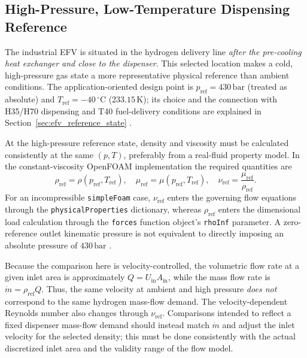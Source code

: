 \subsection{High-Pressure, Low-Temperature Dispensing Reference}
\label{sec:doe_highpressure_state}

The industrial EFV is situated in the hydrogen delivery line \emph{after the pre-cooling heat exchanger and close to the dispenser}. This selected location makes a cold, high-pressure gas state a more representative physical reference than ambient conditions. The application-oriented design point is $p_{\mathrm{ref}}=430\,\mathrm{bar}$ (treated as absolute) and $T_{\mathrm{ref}}=-40\,^{\circ}\mathrm{C}$ ($233.15\,\mathrm{K}$); its choice and the connection with H35/H70 dispensing and T40 fuel-delivery conditions are explained in Section~\ref{sec:efv_reference_state} \cite{sae_j2601,elgowainy2017}.

At the high-pressure reference state, density and viscosity must be calculated consistently at the same $(p,T)$, preferably from a real-fluid property model. In the constant-viscosity OpenFOAM implementation the required quantities are
\begin{equation}
\rho_{\mathrm{ref}}=\rho(p_{\mathrm{ref}},T_{\mathrm{ref}}),\quad
\mu_{\mathrm{ref}}=\mu(p_{\mathrm{ref}},T_{\mathrm{ref}}),\quad
\nu_{\mathrm{ref}}=\frac{\mu_{\mathrm{ref}}}{\rho_{\mathrm{ref}}}.
\label{eq:highpressure_properties}
\end{equation}
For an incompressible \texttt{simpleFoam} case, $\nu_{\mathrm{ref}}$ enters the governing flow equations through the \texttt{physicalProperties} dictionary, whereas $\rho_{\mathrm{ref}}$ enters the dimensional load calculation through the \texttt{forces} function object's \texttt{rhoInf} parameter. A zero-reference outlet kinematic pressure is not equivalent to directly imposing an absolute pressure of $430\,\mathrm{bar}$ \cite{openfoam_user,nist_refprop_online}.

Because the comparison here is velocity-controlled, the volumetric flow rate at a given inlet area is approximately $Q=U_{\mathrm{in}}A_{\mathrm{in}}$, while the mass flow rate is $\dot m=\rho_{\mathrm{ref}}Q$. Thus, the same velocity at ambient and high pressure \emph{does not} correspond to the same hydrogen mass-flow demand. The velocity-dependent Reynolds number also changes through $\nu_{\mathrm{ref}}$. Comparisons intended to reflect a fixed dispenser mass-flow demand should instead match $\dot m$ and adjust the inlet velocity for the selected density; this must be done consistently with the actual discretized inlet area and the validity range of the flow model.

